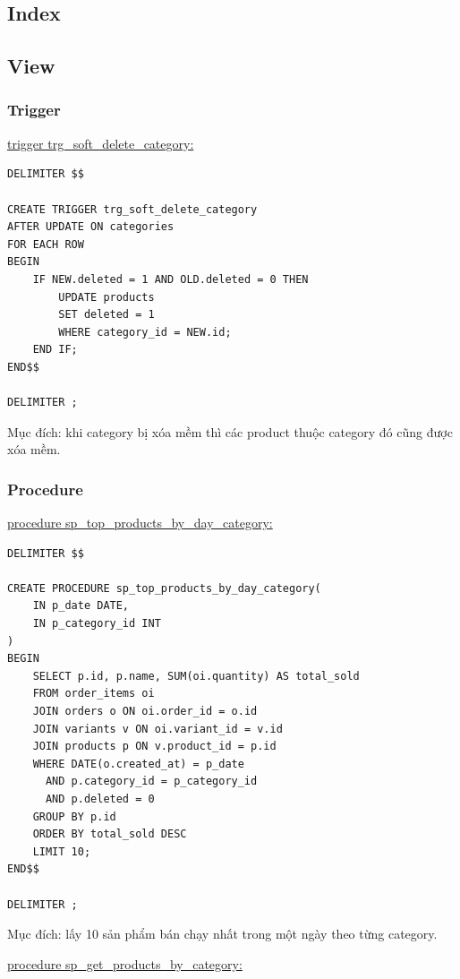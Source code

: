 \subsection{Index}

\subsection{View}

\subsubsection{Trigger}

\underline{trigger trg\_soft\_delete\_category:}

\begin{verbatim}
DELIMITER $$

CREATE TRIGGER trg_soft_delete_category
AFTER UPDATE ON categories
FOR EACH ROW
BEGIN
    IF NEW.deleted = 1 AND OLD.deleted = 0 THEN
        UPDATE products
        SET deleted = 1
        WHERE category_id = NEW.id;
    END IF;
END$$

DELIMITER ;
\end{verbatim}

Mục đích: khi category bị xóa mềm thì các product thuộc category đó cũng được xóa mềm.

\subsubsection{Procedure}

\underline{procedure sp\_top\_products\_by\_day\_category:}

\begin{verbatim}
DELIMITER $$

CREATE PROCEDURE sp_top_products_by_day_category(
    IN p_date DATE,
    IN p_category_id INT
)
BEGIN
    SELECT p.id, p.name, SUM(oi.quantity) AS total_sold
    FROM order_items oi
    JOIN orders o ON oi.order_id = o.id
    JOIN variants v ON oi.variant_id = v.id
    JOIN products p ON v.product_id = p.id
    WHERE DATE(o.created_at) = p_date
      AND p.category_id = p_category_id
      AND p.deleted = 0
    GROUP BY p.id
    ORDER BY total_sold DESC
    LIMIT 10;
END$$

DELIMITER ;
\end{verbatim}

Mục đích: lấy 10 sản phẩm bán chạy nhất trong một ngày theo từng category.

\underline{procedure sp\_get\_products\_by\_category:}


